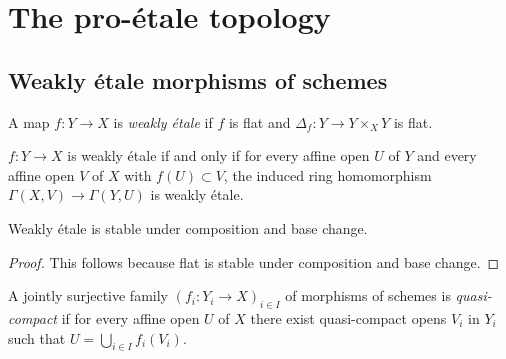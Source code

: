 \chapter{The pro-étale topology}

\section{Weakly étale morphisms of schemes}

\begin{definition}
    A map $f \colon Y \to X$ is \emph{weakly étale} if $f$ is flat and
    $\Delta_f\colon Y \to Y \times_{X} Y$ is flat.

    \leanok
    \label{def:weakly-etale-morphism}
\end{definition}

\begin{lemma}
    $f \colon Y \to X$ is weakly étale if and only if
    for every affine open $U$ of $Y$ and every affine open $V$ of $X$ with $f(U) \subset V$,
    the induced ring homomorphism $\Gamma(X, V) \to \Gamma(Y, U)$ is weakly étale.
    \label{lemma:weakly-etale-hasringhomprop}
\end{lemma}

\begin{lemma}
    Weakly étale is stable under composition and base change.
    \leanok
    \label{lemma:weakly-etale-stable}
\end{lemma}

\begin{proof}
    This follows because flat is stable under composition and base change.
    \leanok
\end{proof}

\begin{definition}
    A jointly surjective family $(f_i \colon Y_i \to X)_{i \in I}$ of morphisms of schemes is
    \emph{quasi-compact} if for
    every affine open $U$ of $X$ there exist quasi-compact opens $V_i$ in $Y_i$ such that
    $U = \bigcup_{i \in  I} f_i(V_i)$.
    \leanok
    \label{def:qc-cover}
\end{definition}

